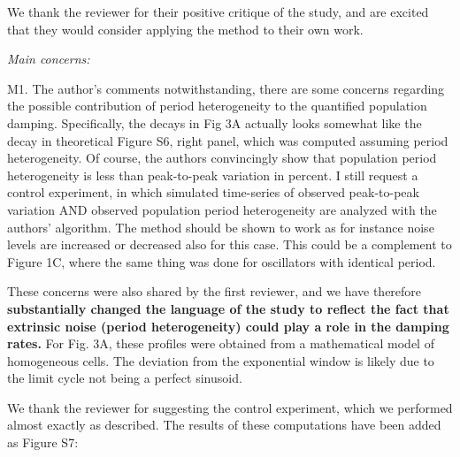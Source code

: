 \documentclass[11pt, letterpaper]{article}
\newenvironment{reviewer}{\itshape\color{gray}}{}
\begin{document}
We thank the reviewer for their positive critique of the study, and are excited that they would consider applying the method to their own work.

\begin{reviewer}
Main concerns:

M1. The author's comments notwithstanding, there are some concerns regarding the possible contribution of period heterogeneity to the quantified population damping. Specifically, the decays in Fig 3A actually looks somewhat like the decay in theoretical Figure S6, right panel, which was computed assuming period heterogeneity. Of course, the authors convincingly show that population period heterogeneity is less than peak-to-peak variation in percent. I still request a control experiment, in which simulated time-series of observed peak-to-peak variation AND observed population period heterogeneity are analyzed with the authors' algorithm. The method should be shown to work as for instance noise levels are increased or decreased also for this case. This could be a complement to Figure 1C, where the same thing was done for oscillators with identical period.
\end{reviewer}

These concerns were also shared by the first reviewer, and we have therefore {\bfseries substantially changed the language of the study to reflect the fact that extrinsic noise (period heterogeneity) could play a role in the damping rates.}
For Fig. 3A, these profiles were obtained from a mathematical model of homogeneous cells.
The deviation from the exponential window is likely due to the limit cycle not being a perfect sinusoid.

We thank the reviewer for suggesting the control experiment, which we performed almost exactly as described. The results of these computations have been added as Figure S7:
\end{document}
